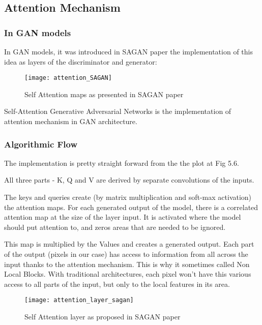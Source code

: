 \subsection{Attention Mechanism}


\subsubsection{In GAN models}

In GAN models, it was introduced in SAGAN paper \cite{SAGAN} the implementation of this idea as layers of the discriminator and generator:


\begin{figure}[h]
\centering
\texttt{[image: attention\_SAGAN]}
\caption{Self Attention maps as presented in SAGAN paper}
\label{fig:x cubed graph}
\end{figure}


Self-Attention Generative Adversarial Networks is the implementation of attention mechanism in GAN architecture.

\subsubsection{Algorithmic Flow}

 
The implementation is pretty straight forward from the the plot at Fig 5.6.


All three parts - K, Q and V are derived by separate convolutions of the inputs. 

The keys and queries create (by matrix multiplication and soft-max activation) the attention maps. For each generated output of the model, there is a correlated attention map at the size of the layer input. It is activated where the model should put attention to, and zeros areas that are needed to be ignored.

This map is multiplied by the Values and creates a generated output. 
Each part of the output (pixels in our case) has access to information from all across the input thanks to the attention mechanism. This is why it sometimes called Non Local Blocks. With traditional architectures, each pixel won't have this various access to all parts of the input, but only to the local features in its area.


\begin{figure}[h]
\centering
\texttt{[image: attention\_layer\_sagan]}
\caption{Self Attention layer as proposed in SAGAN paper}
\label{fig:x cubed graph}
\end{figure}



